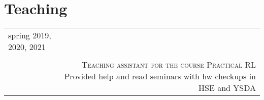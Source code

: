 \section*{Teaching}
\begin{tabular}{@{}L!{\VRule}R}
    spring 2019, 2020, 2021                                                                                                       \\ {} \\ &
    {\textsc{Teaching assistant for the course Practical RL}} Provided help and read seminars with hw checkups in HSE and YSDA \\
\end{tabular}
